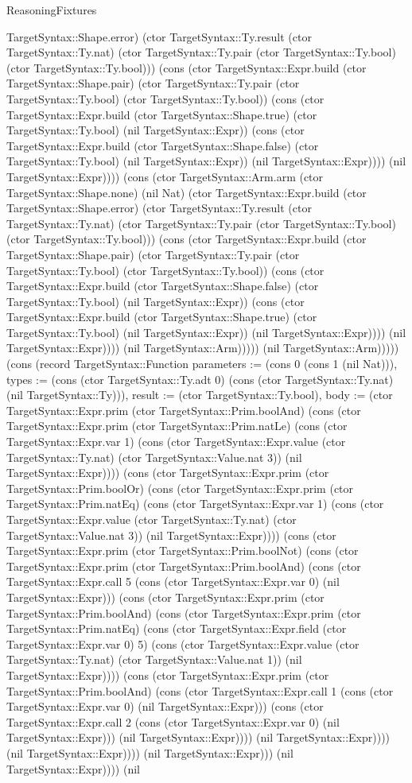 \begin{lexlean}{ReasoningFixtures}
\begin{semanticmodule}
{TargetSyntax::Shape.error) (ctor TargetSyntax::Ty.result (ctor TargetSyntax::Ty.nat) (ctor TargetSyntax::Ty.pair (ctor TargetSyntax::Ty.bool) (ctor TargetSyntax::Ty.bool))) (cons (ctor TargetSyntax::Expr.build (ctor TargetSyntax::Shape.pair) (ctor TargetSyntax::Ty.pair (ctor TargetSyntax::Ty.bool) (ctor TargetSyntax::Ty.bool)) (cons (ctor TargetSyntax::Expr.build (ctor TargetSyntax::Shape.true) (ctor TargetSyntax::Ty.bool) (nil TargetSyntax::Expr)) (cons (ctor TargetSyntax::Expr.build (ctor TargetSyntax::Shape.false) (ctor TargetSyntax::Ty.bool) (nil TargetSyntax::Expr)) (nil TargetSyntax::Expr)))) (nil TargetSyntax::Expr)))) (cons (ctor TargetSyntax::Arm.arm (ctor TargetSyntax::Shape.none) (nil Nat) (ctor TargetSyntax::Expr.build (ctor TargetSyntax::Shape.error) (ctor TargetSyntax::Ty.result (ctor TargetSyntax::Ty.nat) (ctor TargetSyntax::Ty.pair (ctor TargetSyntax::Ty.bool) (ctor TargetSyntax::Ty.bool))) (cons (ctor TargetSyntax::Expr.build (ctor TargetSyntax::Shape.pair) (ctor TargetSyntax::Ty.pair (ctor TargetSyntax::Ty.bool) (ctor TargetSyntax::Ty.bool)) (cons (ctor TargetSyntax::Expr.build (ctor TargetSyntax::Shape.false) (ctor TargetSyntax::Ty.bool) (nil TargetSyntax::Expr)) (cons (ctor TargetSyntax::Expr.build (ctor TargetSyntax::Shape.true) (ctor TargetSyntax::Ty.bool) (nil TargetSyntax::Expr)) (nil TargetSyntax::Expr)))) (nil TargetSyntax::Expr)))) (nil TargetSyntax::Arm))))) (nil TargetSyntax::Arm))))}) (cons (record TargetSyntax::Function {parameters := (cons 0 (cons 1 (nil Nat))), types := (cons (ctor TargetSyntax::Ty.adt 0) (cons (ctor TargetSyntax::Ty.nat) (nil TargetSyntax::Ty))), result := (ctor TargetSyntax::Ty.bool), body := (ctor TargetSyntax::Expr.prim (ctor TargetSyntax::Prim.boolAnd) (cons (ctor TargetSyntax::Expr.prim (ctor TargetSyntax::Prim.natLe) (cons (ctor TargetSyntax::Expr.var 1) (cons (ctor TargetSyntax::Expr.value (ctor TargetSyntax::Ty.nat) (ctor TargetSyntax::Value.nat 3)) (nil TargetSyntax::Expr)))) (cons (ctor TargetSyntax::Expr.prim (ctor TargetSyntax::Prim.boolOr) (cons (ctor TargetSyntax::Expr.prim (ctor TargetSyntax::Prim.natEq) (cons (ctor TargetSyntax::Expr.var 1) (cons (ctor TargetSyntax::Expr.value (ctor TargetSyntax::Ty.nat) (ctor TargetSyntax::Value.nat 3)) (nil TargetSyntax::Expr)))) (cons (ctor TargetSyntax::Expr.prim (ctor TargetSyntax::Prim.boolNot) (cons (ctor TargetSyntax::Expr.prim (ctor TargetSyntax::Prim.boolAnd) (cons (ctor TargetSyntax::Expr.call 5 (cons (ctor TargetSyntax::Expr.var 0) (nil TargetSyntax::Expr))) (cons (ctor TargetSyntax::Expr.prim (ctor TargetSyntax::Prim.boolAnd) (cons (ctor TargetSyntax::Expr.prim (ctor TargetSyntax::Prim.natEq) (cons (ctor TargetSyntax::Expr.field (ctor TargetSyntax::Expr.var 0) 5) (cons (ctor TargetSyntax::Expr.value (ctor TargetSyntax::Ty.nat) (ctor TargetSyntax::Value.nat 1)) (nil TargetSyntax::Expr)))) (cons (ctor TargetSyntax::Expr.prim (ctor TargetSyntax::Prim.boolAnd) (cons (ctor TargetSyntax::Expr.call 1 (cons (ctor TargetSyntax::Expr.var 0) (nil TargetSyntax::Expr))) (cons (ctor TargetSyntax::Expr.call 2 (cons (ctor TargetSyntax::Expr.var 0) (nil TargetSyntax::Expr))) (nil TargetSyntax::Expr)))) (nil TargetSyntax::Expr)))) (nil TargetSyntax::Expr)))) (nil TargetSyntax::Expr))) (nil TargetSyntax::Expr)))) (nil }
\end{semanticmodule}
\end{lexlean}

